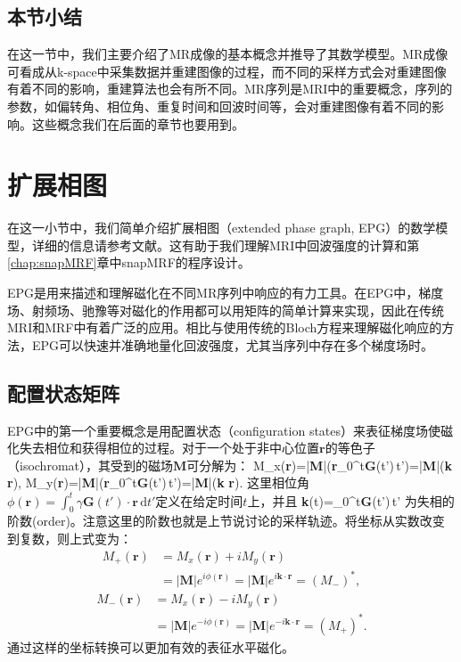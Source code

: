 \subsection{本节小结}
在这一节中，我们主要介绍了MR成像的基本概念并推导了其数学模型。MR成像可看成从k-space中采集数据并重建图像的过程，而不同的采样方式会对重建图像有着不同的影响，重建算法也会有所不同。MR序列是MRI中的重要概念，序列的参数，如偏转角、相位角、重复时间和回波时间等，会对重建图像有着不同的影响。这些概念我们在后面的章节也要用到。

\section{扩展相图}
\label{sec:epg}
在这一小节中，我们简单介绍扩展相图（extended phase graph, EPG）的数学模型，详细的信息请参考文献\cite{weigel}。这有助于我们理解MRI中回波强度的计算和第\ref{chap:snapMRF}章中snapMRF的程序设计。

EPG是用来描述和理解磁化在不同MR序列中响应的有力工具。在EPG中，梯度场、射频场、驰豫等对磁化的作用都可以用矩阵的简单计算来实现，因此在传统MRI和MRF中有着广泛的应用。相比与使用传统的Bloch方程来理解磁化响应的方法，EPG可以快速并准确地量化回波强度，尤其当序列中存在多个梯度场时。

\subsection{配置状态矩阵}
EPG中的第一个重要概念是用配置状态（configuration states）来表征梯度场使磁化失去相位和获得相位的过程。对于一个处于非中心位置$\textbf{r}$的等色子（isochromat），其受到的磁场$\textbf{M}$可分解为：
 \beq M_x(\textbf{r})=|\textbf{M}|\cos\left(\gamma\textbf{r}\cdot\int_0^t\textbf{G}(t')\,t'\right)=|\textbf{M}|\cos(\textbf{k} \cdot \textbf{r}),\eeq
 \beq M_y(\textbf{r})=|\textbf{M}|\sin\left(\gamma\textbf{r}\cdot\int_0^t\textbf{G}(t')\,t'\right)=|\textbf{M}|\sin(\textbf{k} \cdot \textbf{r}).\eeq
这里相位角$\phi(\textbf{r})=\int_0^t\gamma\textbf{G}(t')\cdot\textbf{r}\,\mathrm{d}t'$定义在给定时间$t$上，并且
 \beq \textbf{k}(t)=\gamma\int_0^t\textbf{G}(t')\,t'\eeq
为失相的阶数(order)。注意这里的阶数也就是上节说讨论的采样轨迹。将坐标从实数改变到复数，则上式变为：
 \begin{align}
 M_+(\textbf{r})&=M_x(\textbf{r})+iM_y(\textbf{r})\nonumber\\ &=|\textbf{M}|e^{i\phi(\textbf{r})}=|\textbf{M}|e^{i\textbf{k} \cdot \textbf{r}}=(M_-)^*,
 \end{align}
 \begin{align} M_-(\textbf{r})&=M_x(\textbf{r})-iM_y(\textbf{r})\nonumber\\ &=|\textbf{M}|e^{-i\phi(\textbf{r})}=|\textbf{M}|e^{-i\textbf{k} \cdot \textbf{r}}=(M_+)^*.\end{align}
通过这样的坐标转换可以更加有效的表征水平磁化。

